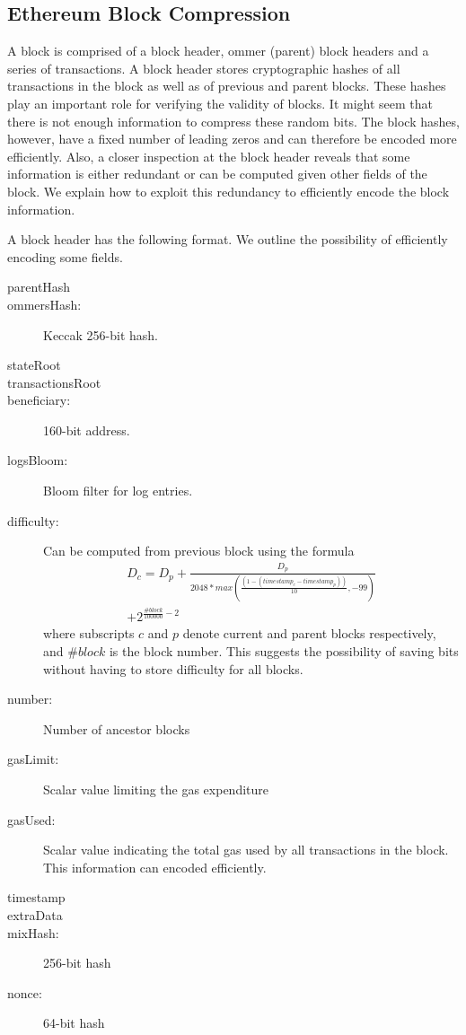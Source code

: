 \subsection{Ethereum Block Compression}\label{sec:blockcompress}

A block is comprised of a block header, ommer (parent) block headers and a series of transactions. 
A block header stores cryptographic hashes of all transactions in the block as well as of previous and parent blocks.
These hashes play an important role for verifying the validity of blocks.
It might seem that there is not enough information to compress these random bits. 
The block hashes, however, have a fixed number of leading zeros and
can therefore be encoded more efficiently.
Also, a closer inspection at the block header reveals that 
some information is either redundant or can be computed given other fields of the block.
We explain how to exploit this redundancy to efficiently encode the block information.

A block header has the following format. We outline the possibility of efficiently encoding some fields. 
\begin{description}
 \item[parentHash] 
 \item[ommersHash:]  Keccak 256-bit hash.
 \item[stateRoot]  
 \item[transactionsRoot]
 \item[beneficiary:]160-bit address.
 \item[logsBloom:] Bloom filter for log entries.
 \item[difficulty:] Can be computed from previous block using the formula
	\begin{multline*}
	D_{c} = D_{p} + \frac{D_{p}}{2048 * max(\frac{(1 - (timestamp_{c} - timestamp_{p}))}{10}, -99)}\\ + 2^{\frac{\#block}{100000} - 2}
        \end{multline*}
	where subscripts $c$ and $p$ denote current and parent blocks respectively, and $\#block$ is the block number. 
 This suggests the possibility of saving bits without having to store difficulty for all blocks.
 \item[number:] Number of ancestor blocks
 \item[gasLimit:] Scalar value limiting the gas expenditure
 \item[gasUsed:] Scalar value indicating the total gas used by all transactions in the block. This information can encoded efficiently.
 \item[timestamp]
 \item[extraData]
 \item[mixHash:] 256-bit hash
 \item[nonce:] 64-bit hash
\end{description}

